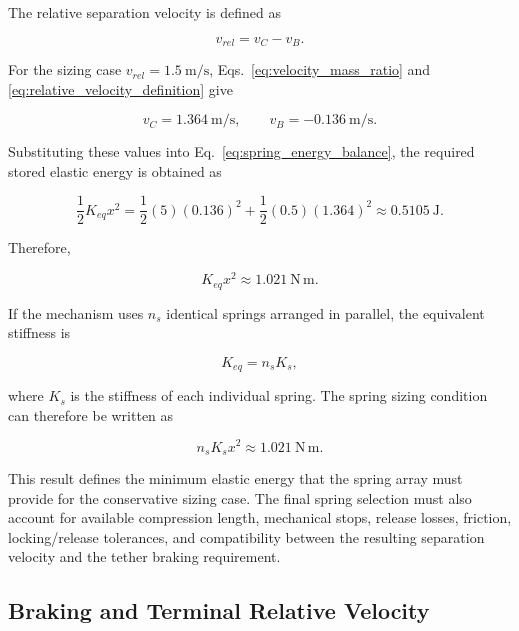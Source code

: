 The relative separation velocity is defined as

\begin{equation}
v_{rel} = v_C - v_B .
\label{eq:relative_velocity_definition}
\end{equation}

For the sizing case \(v_{rel}=1.5~\mathrm{m/s}\), Eqs.~\eqref{eq:velocity_mass_ratio} and \eqref{eq:relative_velocity_definition} give

\begin{equation}
v_C = 1.364~\mathrm{m/s},
\qquad
v_B = -0.136~\mathrm{m/s}.
\label{eq:satbc_velocity_values}
\end{equation}

Substituting these values into Eq.~\eqref{eq:spring_energy_balance}, the required stored elastic energy is obtained as

\begin{equation}
\frac{1}{2} K_{eq} x^2 =
\frac{1}{2}(5)(0.136)^2 +
\frac{1}{2}(0.5)(1.364)^2
\approx 0.5105~\mathrm{J}.
\label{eq:required_elastic_energy}
\end{equation}

Therefore,

\begin{equation}
K_{eq}x^2 \approx 1.021~\mathrm{N\,m}.
\label{eq:keq_x2_requirement}
\end{equation}

If the mechanism uses \(n_s\) identical springs arranged in parallel, the equivalent stiffness is

\begin{equation}
K_{eq} = n_s K_s ,
\label{eq:equivalent_stiffness_parallel}
\end{equation}

where \(K_s\) is the stiffness of each individual spring. The spring sizing condition can therefore be written as

\begin{equation}
n_s K_s x^2 \approx 1.021~\mathrm{N\,m}.
\label{eq:spring_array_sizing_condition}
\end{equation}

This result defines the minimum elastic energy that the spring array must provide for the conservative sizing case. The final spring selection must also account for available compression length, mechanical stops, release losses, friction, locking/release tolerances, and compatibility between the resulting separation velocity and the tether braking requirement.

\subsection{Braking and Terminal Relative Velocity}
\label{sub:braking_terminal_velocity}

